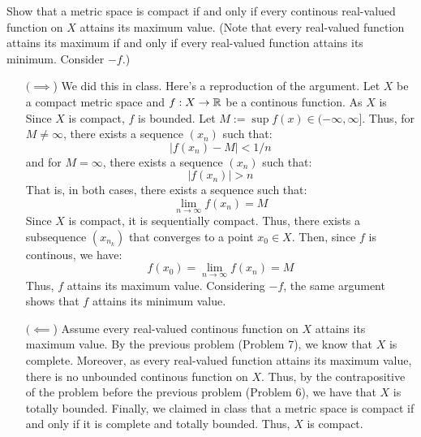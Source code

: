 \documentclass[12pt]{article}
\begin{document}
\begin{problab}{8}
    Show that a metric space is compact if and only if every continous real-valued function on $X$ attains its maximum value. (Note that every real-valued function attains its maximum if and only if every real-valued function attains its minimum. Consider $-f$.)
\end{problab}
\begin{solu}
    \bbni
    \begin{itemize}
        \item[$(\implies$)] We did this in class. Here's a reproduction of the argument. Let $X$ be a compact metric space and $f: X \to \mathbb R$ be a continous function. As $X$ is  Since $X$ is compact, $f$ is bounded.  Let $M := \sup f(x) \in (-\infty, \infty]$. Thus, for $M \neq \infty$, there exists a sequence $(x_n)$ such that: 
        \[ |f(x_n) - M| < 1/n\]
        and for $M = \infty$, there exists a sequence $(x_n)$ such that:
        \[|f(x_n)| > n\]
        That is, in both cases, there exists a sequence such that:
        \[\lim_{n \to \infty} f(x_n) = M \]
        Since $X$ is compact, it is sequentially compact. Thus, there exists a subsequence $(x_{n_k})$ that converges to a point $x_0 \in X$. \bbni 
        Then, since $f$ is continous, we have: 
        \[ f(x_0) = \lim_{n\to\infty} f(x_n) = M \]
        Thus, $f$ attains its maximum value. Considering $-f$, the same argument shows that $f$ attains its minimum value. 
        \item[$(\impliedby$)] Assume every real-valued continous function on $X$ attains its maximum value. By the previous problem (Problem 7), we know that $X$ is complete. Moreover, as every real-valued function attains its maximum value, there is no unbounded continous function on $X$. Thus, by the contrapositive of the problem before the previous problem (Problem 6), we have that $X$ is totally bounded. Finally, we claimed in class that a metric space is compact if and only if it is complete and totally bounded. Thus, $X$ is compact.        
    \end{itemize}
\end{solu}
\end{document}
